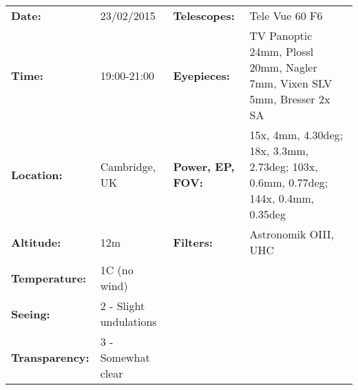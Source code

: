 \begin{tabular}{ p{0.9in} p{1.3in} p{1.2in} p{5.2in}}
{\bf Date:} & 23/02/2015 & {\bf Telescopes:} & Tele Vue 60 F6 \\ 
{\bf Time:} & 19:00-21:00 & {\bf Eyepieces:} & TV Panoptic 24mm, Plossl 20mm, Nagler 7mm, Vixen SLV 5mm, Bresser 2x SA \\ 
{\bf Location:} & Cambridge, UK & {\bf Power, EP, FOV:} & 15x, 4mm, 4.30deg; 18x, 3.3mm, 2.73deg; 103x, 0.6mm, 0.77deg; 144x, 0.4mm, 0.35deg \\ 
{\bf Altitude:} & 12m & {\bf Filters:} & Astronomik OIII, UHC \\ 
{\bf Temperature:} & 1C (no wind) & & \\ 
{\bf Seeing:} & 2 - Slight undulations & & \\ 
{\bf Transparency:} & 3 - Somewhat clear & & \\ 
\end{tabular}
